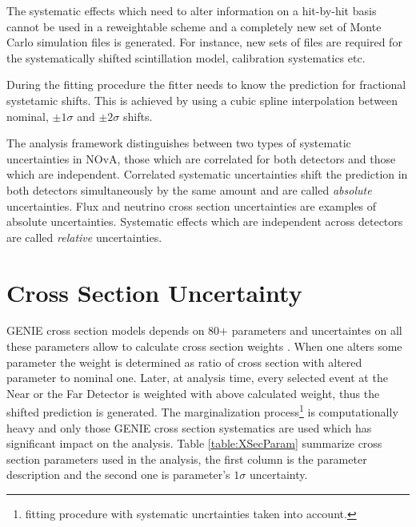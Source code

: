 The systematic effects which need to alter information on a hit-by-hit basis cannot be used in a reweightable scheme 
and a completely new set of Monte Carlo simulation files is generated. For instance, new sets of files are required for 
the systematically shifted scintillation model, calibration systematics etc. 

During the fitting procedure the fitter needs to know the prediction for fractional systetamic shifts. This is 
achieved by using a cubic spline interpolation between nominal, $\pm 1\sigma$ and $\pm 2\sigma$ shifts. 

The analysis framework distinguishes between two types of systematic uncertainties in NOvA, those which are correlated for 
both detectors and those which are independent. Correlated systematic uncertainties shift the prediction in both detectors
simultaneously by the same amount and are called \textit{absolute} uncertainties. Flux and neutrino cross section 
uncertainties are examples of absolute uncertainties. Systematic effects which are independent across detectors 
are called \textit{relative} uncertainties.  

\section{Cross Section Uncertainty}
GENIE cross section models depends on 80+ parameters and uncertaintes on all these parameters allow to calculate cross
section weights \cite{GENIE}. When one alters some parameter the weight is determined as ratio of cross section with altered 
parameter to nominal one. Later, at analysis time, every selected event at the Near or the Far Detector is weighted with 
above calculated weight, thus the shifted prediction is generated. The marginalization process\footnote{fitting procedure with 
systematic uncrtainties taken into account.} is computationally heavy and only those GENIE cross section systematics are 
used which has significant impact on the analysis. Table \ref{table:XSecParam} summarize cross section parameters used in
the analysis, the first column is the parameter description and the second one is parameter's $1\sigma$ uncertainty. 

